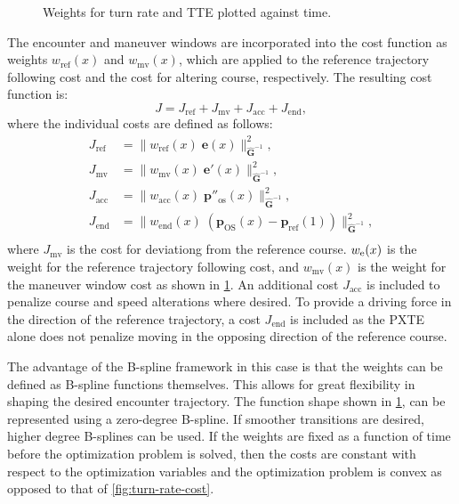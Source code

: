 \begin{figure}
    \centering
    
    \caption{Weights for turn rate and TTE plotted against time.}
    \label{fig:maneuver-window}
\end{figure}

The encounter and maneuver windows are incorporated into the cost function as weights $w_\text{ref}(x)$ and $w_\text{mv}(x)$, which are applied to the reference trajectory following cost and the cost for altering course, respectively. The resulting cost function is:
\begin{equation}\label{eq:cost-maneuver-window-total}
    J = J_\text{ref} + J_\text{mv} + J_\mathrm{acc} + J_\mathrm{end},
\end{equation}
where the individual costs are defined as follows:
\begin{subequations}\label{eq:cost-maneuver-window}
    \begin{align}
        J_\text{ref} &= \|w_\text{ref}(x)\;\mathbf e(x)\|_{\mathbf{\hat G}^{-1}}^2 , 
        \label{eq:cost-maneuver-window-ref}\\
        J_\text{mv} &= \|w_\text{mv}(x)\;\mathbf e'(x)\|_{\mathbf{\hat G}^{-1}}^2 ,
        \label{eq:cost-maneuver-window-mv}\\
        J_\mathrm{acc} &= \|w_\text{acc}(x)\;\mathbf p''_\text{os}(x)\|_{\mathbf{\hat G}^{-1}}^2 , \label{eq:cost-maneuver-window-acc}\\
        J_\mathrm{end} &= \|w_\text{end}(x)\;(\mathbf p_\text{OS}(x)-\mathbf p_\text{ref}(1))\|_{\mathbf{\hat G}^{-1}}^2 , \label{eq:cost-maneuver-window-end}\\
    \end{align}
\end{subequations}
where $J_\text{mv}$ is the cost for deviationg from the reference course. $w_\text e(x)$ is the weight for the reference trajectory following cost, and $w_\text{mv}(x)$ is the weight for the maneuver window cost as shown in \cref{fig:maneuver-window}. An additional cost $J_\mathrm{acc}$ is included to penalize course and speed alterations where desired. To provide a driving force in the direction of the reference trajectory, a cost $J_\mathrm{end}$ is included as the PXTE alone does not penalize moving in the opposing direction of the reference course. 

The advantage of the B-spline framework in this case is that the weights can be defined as B-spline functions themselves. This allows for great flexibility in shaping the desired encounter trajectory. The function shape shown in \cref{fig:maneuver-window}, can be represented using a zero-degree B-spline. If smoother transitions are desired, higher degree B-splines can be used.
If the weights are fixed as a function of time before the optimization problem is solved, then the costs are constant with respect to the optimization variables and the optimization problem is convex as opposed to that of \cref{fig:turn-rate-cost}.

